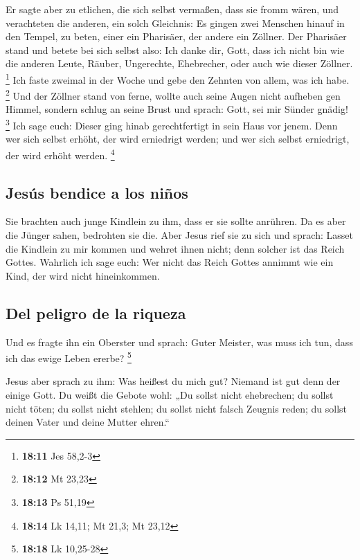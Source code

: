  Er sagte aber zu etlichen, die sich selbst vermaßen, dass
sie fromm wären, und verachteten die anderen, ein solch Gleichnis:
 Es gingen zwei Menschen hinauf in den Tempel, zu beten,
einer ein Pharisäer, der andere ein Zöllner.  Der
Pharisäer stand und betete bei sich selbst also: Ich danke dir, Gott,
dass ich nicht bin wie die anderen Leute, Räuber, Ungerechte,
Ehebrecher, oder auch wie dieser Zöllner. \footnote{\textbf{18:11} Jes
  58,2-3}  Ich faste zweimal in der Woche und gebe den
Zehnten von allem, was ich habe. \footnote{\textbf{18:12} Mt 23,23}
 Und der Zöllner stand von ferne, wollte auch seine Augen
nicht aufheben gen Himmel, sondern schlug an seine Brust und sprach:
Gott, sei mir Sünder gnädig! \footnote{\textbf{18:13} Ps 51,19}
 Ich sage euch: Dieser ging hinab gerechtfertigt in sein
Haus vor jenem. Denn wer sich selbst erhöht, der wird erniedrigt werden;
und wer sich selbst erniedrigt, der wird erhöht werden. \footnote{\textbf{18:14}
  Lk 14,11; Mt 21,3; Mt 23,12}

\hypertarget{jesuxfas-bendice-a-los-niuxf1os}{%
\subsection{Jesús bendice a los
niños}\label{jesuxfas-bendice-a-los-niuxf1os}}

 Sie brachten auch junge Kindlein zu ihm, dass er sie
sollte anrühren. Da es aber die Jünger sahen, bedrohten sie die.
 Aber Jesus rief sie zu sich und sprach: Lasset die
Kindlein zu mir kommen und wehret ihnen nicht; denn solcher ist das
Reich Gottes.  Wahrlich ich sage euch: Wer nicht das
Reich Gottes annimmt wie ein Kind, der wird nicht hineinkommen.

\hypertarget{del-peligro-de-la-riqueza}{%
\subsection{Del peligro de la riqueza}\label{del-peligro-de-la-riqueza}}

 Und es fragte ihn ein Oberster und sprach: Guter
Meister, was muss ich tun, dass ich das ewige Leben ererbe? \footnote{\textbf{18:18}
  Lk 10,25-28}

 Jesus aber sprach zu ihm: Was heißest du mich gut?
Niemand ist gut denn der einige Gott.  Du weißt die
Gebote wohl: „Du sollst nicht ehebrechen; du sollst nicht töten; du
sollst nicht stehlen; du sollst nicht falsch Zeugnis reden; du sollst
deinen Vater und deine Mutter ehren.``

